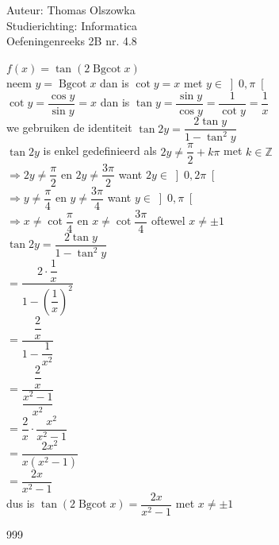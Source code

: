 \documentclass[a4paper]{article}
\newcommand{\Bgcot}{\operatorname{Bgcot}}
\begin{document}
\noindent \large Auteur: Thomas Olszowka \\
\noindent \large Studierichting: Informatica \\
\noindent \large Oefeningenreeks 2B nr. 4.8 \\

\medskip

\normalsize

$f(x) = \tan(2 \Bgcot x)$ \\

neem $y = \Bgcot x$ dan is $ \cot y = x$ met $y \in \left]0, \pi\right[ $\\


$\cot y = \dfrac{\cos y}{\sin y} = x$ dan is $\tan y = \dfrac{\sin y}{\cos y} = \dfrac{1}{\cot y} = \dfrac{1}{x}$ \\ 

we gebruiken de identiteit $\tan 2y = \dfrac{2\tan y}{1 - \tan^2 y}$ \\

$\tan 2y$ is enkel gedefinieerd als $2y \neq \dfrac{\pi}{2} + k\pi$ met $k \in \mathbb{Z}$ \\

$\Rightarrow 2y \neq \dfrac{\pi}{2}$ en $2y \neq \dfrac{3\pi}{2}$ want $2y \in \left]0, 2\pi \right[$ \\

$\Rightarrow y \neq \dfrac{\pi}{4}$ en $y \neq \dfrac{3\pi}{4}$ want $y \in \left]0, \pi \right[$ \\

$\Rightarrow x \neq \cot \dfrac{\pi}{4}$ en $ x \neq \cot \dfrac{3\pi}{4}$ oftewel $x \neq \pm 1$ \\

$\tan 2y = \dfrac{2\tan y}{1 - \tan^2 y}$\\

$=  \dfrac{2 \cdot \dfrac{1}{x}}{1 - \left(\dfrac{1}{x}\right)^2}$ \\

$= \dfrac{\dfrac{2}{x}}{1- \dfrac{1}{x^2}}$ \\

$= \dfrac{\dfrac{2}{x}}{\dfrac{x^2-1}{x^2}}$ \\

$= \dfrac{2}{x} \cdot \dfrac{x^2}{x^2-1}$ \\

$= \dfrac{2x^2}{x(x^2 -1)}$ \\

$= \dfrac{2x}{x^2 - 1}$\\

dus is $\tan(2 \Bgcot x)= \dfrac{2x}{x^2 - 1}$ met $x \neq \pm 1$ \\

\begin{thebibliography}{999}
\end{thebibliography}
\end{document}

